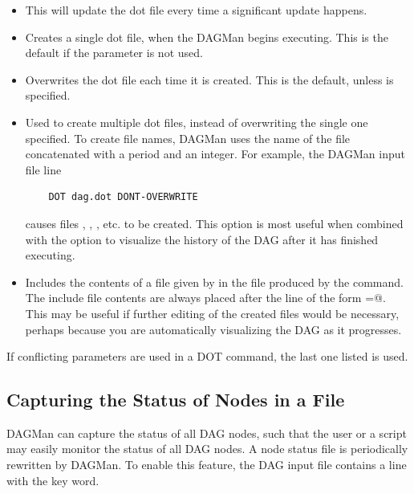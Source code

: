 \begin{itemize}

\item {}  This will update the dot file every time a
significant update happens. 

\item {} Creates a single dot file, when
the DAGMan begins executing. This is the default if the parameter
 is not used.

\item {} Overwrites the dot file each time it
is created. This is the default, unless 
is specified.

\item {} Used to create multiple dot files, instead
of overwriting the single one specified.
To create file names,
DAGMan uses the name of the file concatenated with a period and an
integer. For example, the DAGMan input file line
\begin{verbatim}
    DOT dag.dot DONT-OVERWRITE
\end{verbatim}
causes files
,
,
,
etc. to be created.
This option is
most useful when combined with the  option to
visualize the history of the DAG after it has finished executing. 

\item {} Includes the contents
of a file given by  in the file produced by the
 command.
The include file contents are always placed after the line of
the form
\verb@label=@.
This may be useful if further editing of the created files would
be necessary,
perhaps because you are automatically visualizing the DAG as it
progresses. 

\end{itemize}

If conflicting parameters are used in a DOT command, the last one
listed is used.

\subsection{\label{sec:DAG-node-status}Capturing the Status of Nodes in a File}

DAGMan can capture the status of all DAG nodes,
such that the user or a script may easily monitor the status of all DAG nodes.
A node status file is periodically rewritten by DAGMan.
To enable this feature, the DAG input file contains a line with the
 key word.


